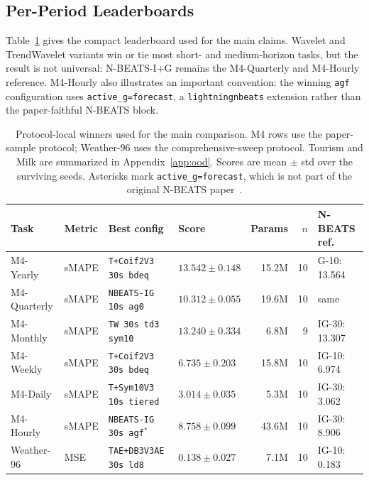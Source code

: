 \documentclass{article}
\begin{document}
\subsection{Per-Period Leaderboards}
\label{sec:m4_leaderboards}

Table~\ref{tab:main_leaderboard} gives the compact leaderboard used for the main claims. Wavelet and TrendWavelet variants win or tie most short- and medium-horizon tasks, but the result is not universal: N-BEATS-I+G \citep{oreshkin2020nbeats} remains the M4-Quarterly and M4-Hourly reference. M4-Hourly also illustrates an important convention: the winning \texttt{agf} configuration uses \texttt{active\_g=forecast}, a \texttt{lightningnbeats} extension rather than the paper-faithful N-BEATS block.

\begin{table}[t]
  \caption{Protocol-local winners used for the main comparison. M4 rows use the paper-sample protocol; Weather-96 uses the comprehensive-sweep protocol. Tourism and Milk are summarized in Appendix~\ref{app:ood}. Scores are mean $\pm$ std over the surviving seeds. Asterisks mark \texttt{active\_g=forecast}, which is not part of the original N-BEATS paper~\citep{oreshkin2020nbeats}.}
  \label{tab:main_leaderboard}
  \centering
  \scriptsize
  \setlength{\tabcolsep}{2.3pt}
  \begin{tabular}{llllrrl}
    \toprule
    Task & Metric & Best config & Score & Params & $n$ & N-BEATS ref. \\
    \midrule
    M4-Yearly    & sMAPE & \texttt{T+Coif2V3 30s bdeq}     & $13.542 \pm 0.148$ & 15.2M & 10 & G-10: 13.564 \\
    M4-Quarterly & sMAPE & \texttt{NBEATS-IG 10s ag0}      & $10.312 \pm 0.055$ & 19.6M & 10 & same \\
    M4-Monthly   & sMAPE & \texttt{TW 30s td3 sym10}       & $13.240 \pm 0.334$ & 6.8M  & 9  & IG-30: 13.307 \\
    M4-Weekly    & sMAPE & \texttt{T+Coif2V3 30s bdeq}     & $6.735 \pm 0.203$  & 15.8M & 10 & IG-10: 6.974 \\
    M4-Daily     & sMAPE & \texttt{T+Sym10V3 10s tiered}   & $3.014 \pm 0.035$  & 5.3M  & 10 & IG-30: 3.062 \\
    M4-Hourly    & sMAPE & \texttt{NBEATS-IG 30s agf}$^*$  & $8.758 \pm 0.099$  & 43.6M & 10 & IG-30: 8.906 \\
    Weather-96   & MSE   & \texttt{TAE+DB3V3AE 30s ld8}    & $0.138 \pm 0.027$  & 7.1M  & 10 & IG-10: 0.183 \\
    \bottomrule
  \end{tabular}
\end{table}
\end{document}
